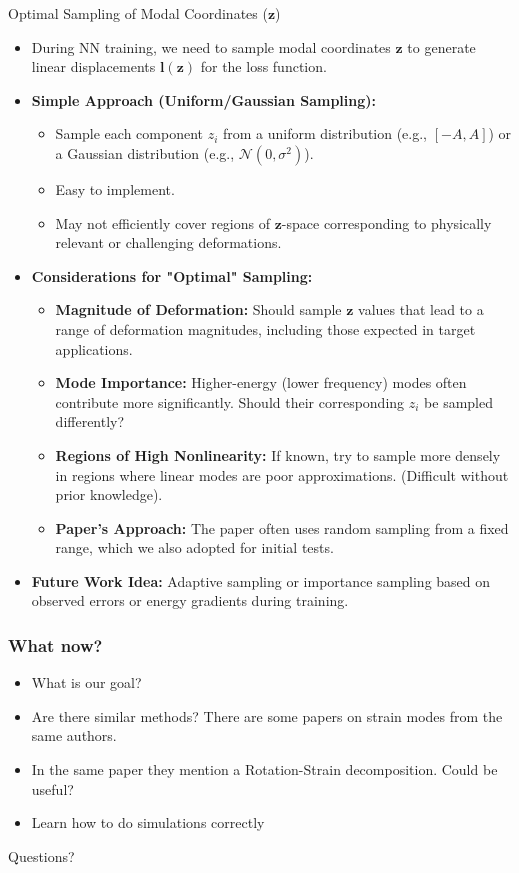 \documentclass{beamer}
\begin{document}
\begin{frame}{Optimal Sampling of Modal Coordinates (\(\bm{z}\))}
    \begin{itemize}
        \item During NN training, we need to sample modal coordinates \(\bm{z}\) to generate linear displacements \(\bm{l}(\bm{z})\) for the loss function.
        \item \textbf{Simple Approach (Uniform/Gaussian Sampling):}
        \begin{itemize}
            \item Sample each component \(z_i\) from a uniform distribution (e.g., \([-A, A]\)) or a Gaussian distribution (e.g., \(\mathcal{N}(0, \sigma^2)\)).
            \item Easy to implement.
            \item May not efficiently cover regions of \(\bm{z}\)-space corresponding to physically relevant or challenging deformations.
        \end{itemize}
        \item \textbf{Considerations for "Optimal" Sampling:}
        \begin{itemize}
            \item \textbf{Magnitude of Deformation:} Should sample \(\bm{z}\) values that lead to a range of deformation magnitudes, including those expected in target applications.
            \item \textbf{Mode Importance:} Higher-energy (lower frequency) modes often contribute more significantly. Should their corresponding \(z_i\) be sampled differently?
            \item \textbf{Regions of High Nonlinearity:} If known, try to sample more densely in regions where linear modes are poor approximations. (Difficult without prior knowledge).
            \item \textbf{Paper's Approach:} The paper often uses random sampling from a fixed range, which we also adopted for initial tests.
        \end{itemize}
        \item \textbf{Future Work Idea:} Adaptive sampling or importance sampling based on observed errors or energy gradients during training.
    \end{itemize}
\end{frame}


\begin{frame}
    \frametitle{What now?}
    \begin{itemize}
        \item What is our goal?
        \item Are there similar methods? There are some papers on strain modes from the same authors.
        \item In the same paper they mention a Rotation-Strain decomposition. Could be useful?
        \item Learn how to do simulations correctly
    
    \end{itemize}
\end{frame}

\begin{frame}
    \begin{center}
        \color{blue} \Huge{Questions?}
    \end{center}

\end{frame}
\end{document}
